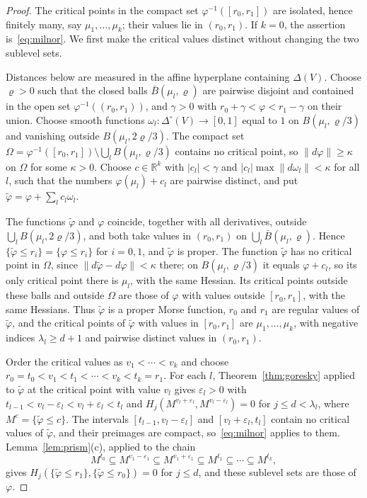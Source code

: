 \documentclass[11pt]{article}
\theoremstyle{definition}
\numberwithin{equation}{section}
\newcommand{\R}{\mathbb R}
\begin{document}
\begin{proof}
The critical points in the compact set $\varphi^{-1}([r_0,r_1])$ are isolated, hence finitely many, say $\mu_1,\ldots,\mu_k$; their values lie in $(r_0,r_1)$. If $k=0$, the assertion is~\eqref{eq:milnor}. We first make the critical values distinct without changing the two sublevel sets.

Distances below are measured in the affine hyperplane containing $\Delta(V)$. Choose $\varrho>0$ such that the closed balls $\bar B(\mu_l,\varrho)$ are pairwise disjoint and contained in the open set $\varphi^{-1}((r_0,r_1))$, and $\gamma>0$ with $r_0+\gamma<\varphi<r_1-\gamma$ on their union. Choose smooth functions $\omega_l:\Delta^\circ(V)\to[0,1]$ equal to $1$ on $B(\mu_l,\varrho/3)$ and vanishing outside $B(\mu_l,2\varrho/3)$. The compact set $\Omega=\varphi^{-1}([r_0,r_1])\setminus\bigcup_lB(\mu_l,\varrho/3)$ contains no critical point, so $\|d\varphi\|\ge\kappa$ on $\Omega$ for some $\kappa>0$. Choose $c\in\R^k$ with $|c_l|<\gamma$ and $|c_l|\max\|d\omega_l\|<\kappa$ for all $l$, such that the numbers $\varphi(\mu_l)+c_l$ are pairwise distinct, and put $\tilde\varphi=\varphi+\sum_lc_l\omega_l$.

The functions $\tilde\varphi$ and $\varphi$ coincide, together with all derivatives, outside $\bigcup_lB(\mu_l,2\varrho/3)$, and both take values in $(r_0,r_1)$ on $\bigcup_l\bar B(\mu_l,\varrho)$. Hence $\{\tilde\varphi\le r_i\}=\{\varphi\le r_i\}$ for $i=0,1$, and $\tilde\varphi$ is proper. The function $\tilde\varphi$ has no critical point in $\Omega$, since $\|d\tilde\varphi-d\varphi\|<\kappa$ there; on $B(\mu_l,\varrho/3)$ it equals $\varphi+c_l$, so its only critical point there is $\mu_l$, with the same Hessian. Its critical points outside these balls and outside $\Omega$ are those of $\varphi$ with values outside $[r_0,r_1]$, with the same Hessians. Thus $\tilde\varphi$ is a proper Morse function, $r_0$ and $r_1$ are regular values of $\tilde\varphi$, and the critical points of $\tilde\varphi$ with values in $[r_0,r_1]$ are $\mu_1,\ldots,\mu_k$, with negative indices $\lambda_l\ge d+1$ and pairwise distinct values in $(r_0,r_1)$.

Order the critical values as $v_1<\cdots<v_k$ and choose $r_0=t_0<v_1<t_1<\cdots<v_k<t_k=r_1$. For each $l$, Theorem~\ref{thm:goresky} applied to $\tilde\varphi$ at the critical point with value $v_l$ gives $\varepsilon_l>0$ with $t_{l-1}<v_l-\varepsilon_l<v_l+\varepsilon_l<t_l$ and $H_j(M^{v_l+\varepsilon_l},M^{v_l-\varepsilon_l})=0$ for $j\le d<\lambda_l$, where $M^c=\{\tilde\varphi\le c\}$. The intervals $[t_{l-1},v_l-\varepsilon_l]$ and $[v_l+\varepsilon_l,t_l]$ contain no critical values of $\tilde\varphi$, and their preimages are compact, so~\eqref{eq:milnor} applies to them. Lemma~\ref{lem:prism}(c), applied to the chain
\begin{equation*}
 M^{t_0}\subseteq M^{v_1-\varepsilon_1}\subseteq M^{v_1+\varepsilon_1}\subseteq M^{t_1}\subseteq\cdots\subseteq M^{t_k},
\end{equation*}
gives $H_j(\{\tilde\varphi\le r_1\},\{\tilde\varphi\le r_0\})=0$ for $j\le d$, and these sublevel sets are those of~$\varphi$.
\end{proof}
\end{document}

